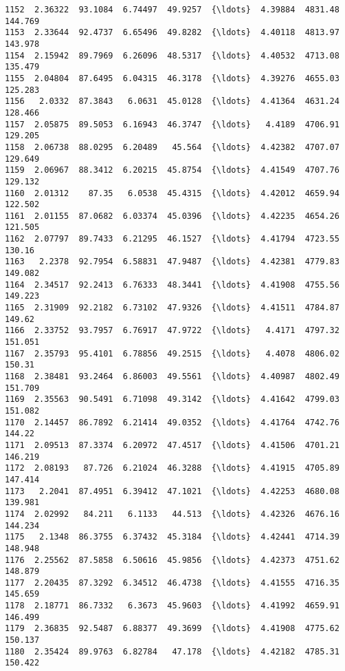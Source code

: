 \documentclass[11pt]{article}
\begin{document}
\begin{tcolorbox}[breakable, size=fbox, boxrule=.5pt, pad at break*=1mm, opacityfill=0]
\begin{Verbatim}[commandchars=\\\{\}]
1152  2.36322  93.1084  6.74497  49.9257  {\ldots}  4.39884  4831.48  144.769
1153  2.33644  92.4737  6.65496  49.8282  {\ldots}  4.40118  4813.97  143.978
1154  2.15942  89.7969  6.26096  48.5317  {\ldots}  4.40532  4713.08  135.479
1155  2.04804  87.6495  6.04315  46.3178  {\ldots}  4.39276  4655.03  125.283
1156   2.0332  87.3843   6.0631  45.0128  {\ldots}  4.41364  4631.24  128.466
1157  2.05875  89.5053  6.16943  46.3747  {\ldots}   4.4189  4706.91  129.205
1158  2.06738  88.0295  6.20489   45.564  {\ldots}  4.42382  4707.07  129.649
1159  2.06967  88.3412  6.20215  45.8754  {\ldots}  4.41549  4707.76  129.132
1160  2.01312    87.35   6.0538  45.4315  {\ldots}  4.42012  4659.94  122.502
1161  2.01155  87.0682  6.03374  45.0396  {\ldots}  4.42235  4654.26  121.505
1162  2.07797  89.7433  6.21295  46.1527  {\ldots}  4.41794  4723.55   130.16
1163   2.2378  92.7954  6.58831  47.9487  {\ldots}  4.42381  4779.83  149.082
1164  2.34517  92.2413  6.76333  48.3441  {\ldots}  4.41908  4755.56  149.223
1165  2.31909  92.2182  6.73102  47.9326  {\ldots}  4.41511  4784.87   149.62
1166  2.33752  93.7957  6.76917  47.9722  {\ldots}   4.4171  4797.32  151.051
1167  2.35793  95.4101  6.78856  49.2515  {\ldots}   4.4078  4806.02   150.31
1168  2.38481  93.2464  6.86003  49.5561  {\ldots}  4.40987  4802.49  151.709
1169  2.35563  90.5491  6.71098  49.3142  {\ldots}  4.41642  4799.03  151.082
1170  2.14457  86.7892  6.21414  49.0352  {\ldots}  4.41764  4742.76   144.22
1171  2.09513  87.3374  6.20972  47.4517  {\ldots}  4.41506  4701.21  146.219
1172  2.08193   87.726  6.21024  46.3288  {\ldots}  4.41915  4705.89  147.414
1173   2.2041  87.4951  6.39412  47.1021  {\ldots}  4.42253  4680.08  139.981
1174  2.02992   84.211   6.1133   44.513  {\ldots}  4.42326  4676.16  144.234
1175   2.1348  86.3755  6.37432  45.3184  {\ldots}  4.42441  4714.39  148.948
1176  2.25562  87.5858  6.50616  45.9856  {\ldots}  4.42373  4751.62  148.879
1177  2.20435  87.3292  6.34512  46.4738  {\ldots}  4.41555  4716.35  145.659
1178  2.18771  86.7332   6.3673  45.9603  {\ldots}  4.41992  4659.91  146.499
1179  2.36835  92.5487  6.88377  49.3699  {\ldots}  4.41908  4775.62  150.137
1180  2.35424  89.9763  6.82784   47.178  {\ldots}  4.42182  4785.31  150.422


\end{Verbatim}
\end{tcolorbox}
\end{document}
